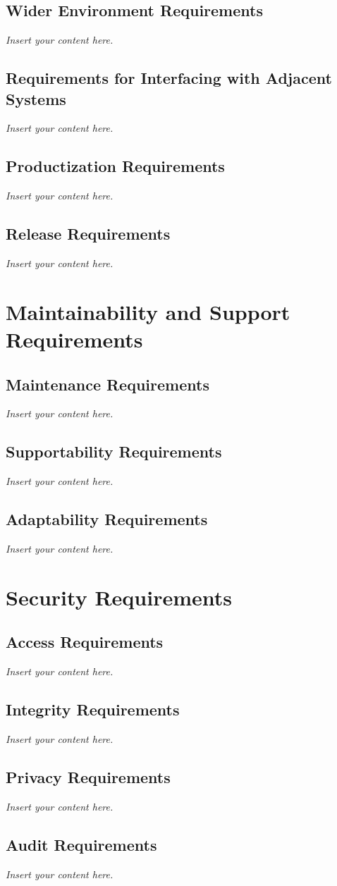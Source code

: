 \documentclass[12pt]{article}
\newcommand{\lips}{\textit{Insert your content here.}}
\begin{document}
\subsection{Wider Environment Requirements}
\lips
\subsection{Requirements for Interfacing with Adjacent Systems}
\lips
\subsection{Productization Requirements}
\lips
\subsection{Release Requirements}
\lips

\section{Maintainability and Support Requirements}
\subsection{Maintenance Requirements}
\lips
\subsection{Supportability Requirements}
\lips
\subsection{Adaptability Requirements}
\lips

\section{Security Requirements}
\subsection{Access Requirements}
\lips
\subsection{Integrity Requirements}
\lips
\subsection{Privacy Requirements}
\lips
\subsection{Audit Requirements}
\lips
\end{document}
